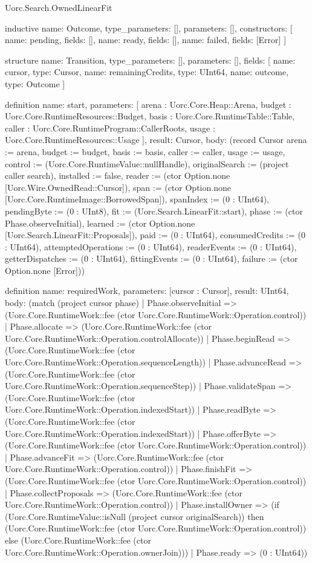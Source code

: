 \begin{lexlean}{Uorc.Search.OwnedLinearFit}
\begin{semanticmodule}
inductive{
  name: Outcome,
  type_parameters: [],
  parameters: [],
  constructors: [
    {name: pending, fields: []},
    {name: ready, fields: []},
    {name: failed, fields: [Error]}
  ]
}

structure{
  name: Transition,
  type_parameters: [],
  parameters: [],
  fields: [
    {name: cursor, type: Cursor},
    {name: remainingCredits, type: UInt64},
    {name: outcome, type: Outcome}
  ]
}

definition{
  name: start,
  parameters: [
    arena : Uorc.Core.Heap::Arena,
    budget : Uorc.Core.RuntimeResources::Budget,
    basis : Uorc.Core.RuntimeTable::Table,
    caller : Uorc.Core.RuntimeProgram::CallerRoots,
    usage : Uorc.Core.RuntimeResources::Usage
  ],
  result: Cursor,
  body: (record Cursor {arena := arena, budget := budget, basis := basis, caller := caller, usage := usage, control := (Uorc.Core.RuntimeValue::nullHandle), originalSearch := (project caller search), installed := false, reader := (ctor Option.none [Uorc.Wire.OwnedRead::Cursor]), span := (ctor Option.none [Uorc.Core.RuntimeImage::BorrowedSpan]), spanIndex := (0 : UInt64), pendingByte := (0 : UInt8), fit := (Uorc.Search.LinearFit::start), phase := (ctor Phase.observeInitial), learned := (ctor Option.none [Uorc.Search.LinearFit::Proposals]), paid := (0 : UInt64), consumedCredits := (0 : UInt64), attemptedOperations := (0 : UInt64), readerEvents := (0 : UInt64), getterDispatches := (0 : UInt64), fittingEvents := (0 : UInt64), failure := (ctor Option.none [Error])})
}

definition{
  name: requiredWork,
  parameters: [cursor : Cursor],
  result: UInt64,
  body: (match (project cursor phase)
    | Phase.observeInitial => (Uorc.Core.RuntimeWork::fee (ctor Uorc.Core.RuntimeWork::Operation.control))
    | Phase.allocate => (Uorc.Core.RuntimeWork::fee (ctor Uorc.Core.RuntimeWork::Operation.controlAllocate))
    | Phase.beginRead => (Uorc.Core.RuntimeWork::fee (ctor Uorc.Core.RuntimeWork::Operation.sequenceLength))
    | Phase.advanceRead => (Uorc.Core.RuntimeWork::fee (ctor Uorc.Core.RuntimeWork::Operation.sequenceStep))
    | Phase.validateSpan => (Uorc.Core.RuntimeWork::fee (ctor Uorc.Core.RuntimeWork::Operation.indexedStart))
    | Phase.readByte => (Uorc.Core.RuntimeWork::fee (ctor Uorc.Core.RuntimeWork::Operation.indexedStart))
    | Phase.offerByte => (Uorc.Core.RuntimeWork::fee (ctor Uorc.Core.RuntimeWork::Operation.control))
    | Phase.advanceFit => (Uorc.Core.RuntimeWork::fee (ctor Uorc.Core.RuntimeWork::Operation.control))
    | Phase.finishFit => (Uorc.Core.RuntimeWork::fee (ctor Uorc.Core.RuntimeWork::Operation.control))
    | Phase.collectProposals => (Uorc.Core.RuntimeWork::fee (ctor Uorc.Core.RuntimeWork::Operation.control))
    | Phase.installOwner => (if (Uorc.Core.RuntimeValue::isNull (project cursor originalSearch)) then (Uorc.Core.RuntimeWork::fee (ctor Uorc.Core.RuntimeWork::Operation.control)) else (Uorc.Core.RuntimeWork::fee (ctor Uorc.Core.RuntimeWork::Operation.ownerJoin)))
    | Phase.ready => (0 : UInt64))
}


\end{semanticmodule}
\end{lexlean}
